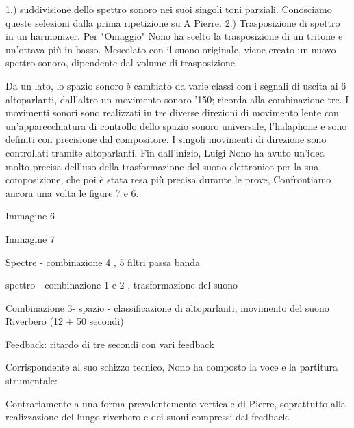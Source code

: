 1.) suddivisione dello spettro sonoro nei suoi singoli toni parziali. Conosciamo queste selezioni dalla prima ripetizione su A Pierre.
2.) Trasposizione di spettro in un harmonizer. Per "Omaggio" Nono ha scelto la trasposizione di un tritone e un'ottava più in basso. Mescolato con il suono originale, viene creato un nuovo spettro sonoro, dipendente dal volume di trasposizione.

Da un lato, lo spazio sonoro è cambiato da varie classi con i segnali di uscita ai 6 altoparlanti, dall'altro un movimento sonoro '150; ricorda alla combinazione tre. I movimenti sonori sono realizzati in tre diverse direzioni di movimento lente con un'apparecchiatura di controllo dello spazio sonoro universale, l'halaphone e sono definiti con precisione dal compositore. I singoli movimenti di direzione sono controllati tramite altoparlanti.
Fin dall'inizio, Luigi Nono ha avuto un'idea molto precisa dell'uso della trasformazione del suono elettronico per la sua composizione, che poi è stata resa più precisa durante le prove, Confrontiamo ancora una volta le figure 7 e 6.

Immagine 6

Immagine 7

Spectre - combinazione 4 , 5 filtri passa banda

spettro - combinazione 1 e 2 , trasformazione del suono

Combinazione 3- spazio - classificazione di altoparlanti, movimento del suono
Riverbero (12 + 50 secondi)

Feedback: ritardo di tre secondi con vari feedback

Corrispondente al suo schizzo tecnico, Nono ha composto la voce e la partitura strumentale:

Contrariamente a una forma prevalentemente verticale di Pierre, soprattutto alla realizzazione del lungo riverbero e dei suoni compressi dal feedback.

